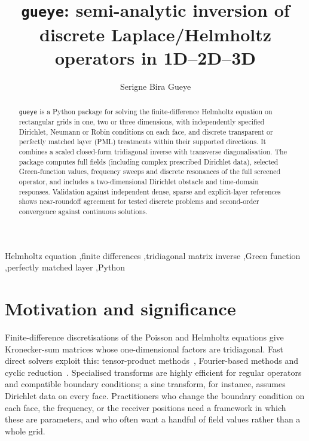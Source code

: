 \documentclass[preprint,12pt,a4paper]{elsarticle}
\begin{document}
\begin{frontmatter}

\title{\texttt{gueye}: semi-analytic inversion of discrete Laplace/Helmholtz operators in 1D--2D--3D}

\author{Serigne Bira Gueye}
\address{Department of Physics, Faculty of Sciences and Techniques, Cheikh Anta Diop University, Dakar, Senegal}

\begin{abstract}
\texttt{gueye} is a Python package for solving the finite-difference Helmholtz equation on rectangular grids in one, two or three dimensions, with independently specified Dirichlet, Neumann or Robin conditions on each face, and discrete transparent or perfectly matched layer (PML) treatments within their supported directions. It combines a scaled closed-form tridiagonal inverse with transverse diagonalisation. The package computes full fields (including complex prescribed Dirichlet data), selected Green-function values, frequency sweeps and discrete resonances of the full screened operator, and includes a two-dimensional Dirichlet obstacle and time-domain responses. Validation against independent dense, sparse and explicit-layer references shows near-roundoff agreement for tested discrete problems and second-order convergence against continuous solutions.
\end{abstract}

\begin{keyword}
Helmholtz equation \sep finite differences \sep tridiagonal matrix inverse \sep Green function \sep perfectly matched layer \sep Python
\end{keyword}

\end{frontmatter}

\linenumbers

\section{Motivation and significance}
Finite-difference discretisations of the Poisson and Helmholtz equations give Kronecker-sum matrices whose one-dimensional factors are tridiagonal.
Fast direct solvers exploit this: tensor-product methods~\cite{LynchRiceThomas1964}, Fourier-based methods and cyclic reduction~\cite{Hockney1965,BuzbeeGolubNielson1970}.
Specialised transforms are highly efficient for regular operators and compatible boundary conditions; a sine transform, for instance, assumes Dirichlet data on every face.
Practitioners who change the boundary condition on each face, the frequency, or the receiver positions need a framework in which these are parameters, and who often want a handful of field values rather than a whole grid.
\end{document}
